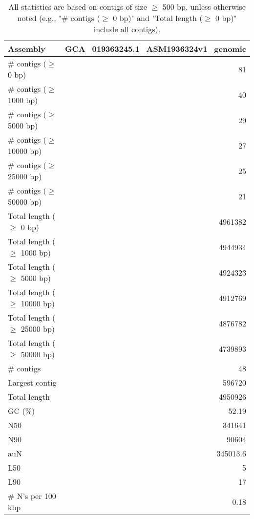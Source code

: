 \documentclass[12pt,a4paper]{article}
\begin{document}
\begin{table}[ht]
\begin{center}
\caption{All statistics are based on contigs of size $\geq$ 500 bp, unless otherwise noted (e.g., "\# contigs ($\geq$ 0 bp)" and "Total length ($\geq$ 0 bp)" include all contigs).}
\begin{tabular}{|l*{1}{|r}|}
\hline
Assembly & GCA\_019363245.1\_ASM1936324v1\_genomic \\ \hline
\# contigs ($\geq$ 0 bp) & 81 \\ \hline
\# contigs ($\geq$ 1000 bp) & 40 \\ \hline
\# contigs ($\geq$ 5000 bp) & 29 \\ \hline
\# contigs ($\geq$ 10000 bp) & 27 \\ \hline
\# contigs ($\geq$ 25000 bp) & 25 \\ \hline
\# contigs ($\geq$ 50000 bp) & 21 \\ \hline
Total length ($\geq$ 0 bp) & 4961382 \\ \hline
Total length ($\geq$ 1000 bp) & 4944934 \\ \hline
Total length ($\geq$ 5000 bp) & 4924323 \\ \hline
Total length ($\geq$ 10000 bp) & 4912769 \\ \hline
Total length ($\geq$ 25000 bp) & 4876782 \\ \hline
Total length ($\geq$ 50000 bp) & 4739893 \\ \hline
\# contigs & 48 \\ \hline
Largest contig & 596720 \\ \hline
Total length & 4950926 \\ \hline
GC (\%) & 52.19 \\ \hline
N50 & 341641 \\ \hline
N90 & 90604 \\ \hline
auN & 345013.6 \\ \hline
L50 & 5 \\ \hline
L90 & 17 \\ \hline
\# N's per 100 kbp & 0.18 \\ \hline
\end{tabular}
\end{center}
\end{table}
\end{document}
